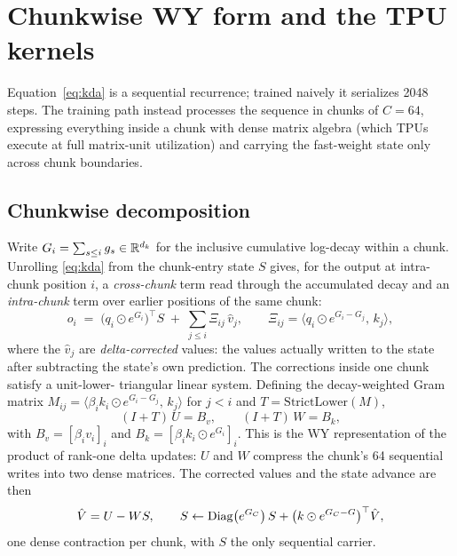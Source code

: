 \section{Chunkwise WY form and the TPU kernels}
\label{sec:kernels}

Equation~\eqref{eq:kda} is a sequential recurrence; trained naively it
serializes 2048 steps. The training path instead processes the sequence
in chunks of $C = 64$, expressing everything inside a chunk with dense
matrix algebra (which TPUs execute at full matrix-unit utilization) and
carrying the fast-weight state only across chunk boundaries.

\subsection{Chunkwise decomposition}

Write $G_i = \sum_{s \le i} g_s \in \mathbb{R}^{d_k}$ for the inclusive
cumulative log-decay within a chunk. Unrolling \eqref{eq:kda} from the
chunk-entry state $S$ gives, for the output at intra-chunk position $i$,
a \emph{cross-chunk} term read through the accumulated decay and an
\emph{intra-chunk} term over earlier positions of the same chunk:
\begin{equation}
o_i \;=\; \big(q_i \odot e^{G_i}\big)^{\top} S
\;+\; \sum_{j \le i} \Xi_{ij}\, \hat{v}_j,
\qquad
\Xi_{ij} = \big\langle q_i \odot e^{G_i - G_j},\, k_j \big\rangle ,
\label{eq:chunk-out}
\end{equation}
where the $\hat{v}_j$ are \emph{delta-corrected} values: the values
actually written to the state after subtracting the state's own
prediction. The corrections inside one chunk satisfy a unit-lower-
triangular linear system. Defining the decay-weighted Gram matrix
$M_{ij} = \langle \beta_i k_i \odot e^{G_i - G_j},\, k_j\rangle$ for
$j < i$ and $T = \mathrm{StrictLower}(M)$,
\begin{equation}
(I + T)\, U = B_v, \qquad (I + T)\, W = B_k,
\label{eq:wy-solve}
\end{equation}
with $B_v = [\beta_i v_i]_i$ and $B_k = [\beta_i k_i \odot e^{G_i}]_i$.
This is the WY representation of the product of rank-one delta updates:
$U$ and $W$ compress the chunk's 64 sequential writes into two dense
matrices. The corrected values and the state advance are then
\begin{equation}
\hat{V} = U - W S,
\qquad
S \leftarrow \operatorname{Diag}\!\big(e^{G_C}\big)\, S
+ \big(k \odot e^{G_C - G}\big)^{\top} \hat{V},
\label{eq:chunk-scan}
\end{equation}
one dense contraction per chunk, with $S$ the only sequential carrier.


